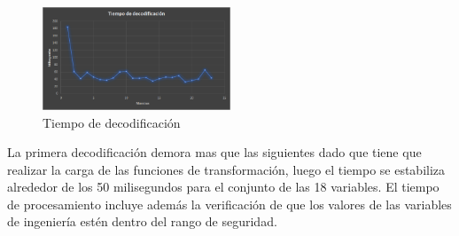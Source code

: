 \documentclass[twoside,twocolumn]{article}
\begin{document}
\begin{figure}[]
  \caption{Tiempo de decodificación}
  \label{fig:TiempoDecodificacion}
  \centering
  \includegraphics[width=0.5\textwidth]{Imagenes/tiempoDecodificacion.png}
\end{figure}

La primera decodificación demora mas que las siguientes dado que tiene que realizar la carga de las funciones de transformación, luego el tiempo se estabiliza alrededor de los 50 milisegundos para el conjunto de las 18 variables. El tiempo de procesamiento incluye además la verificación de que los valores de las variables de ingeniería estén dentro del rango de seguridad.
\end{document}
